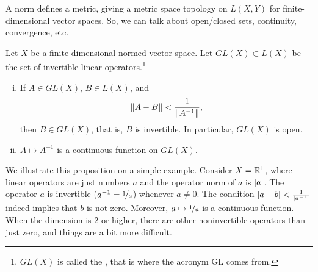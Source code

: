 A norm defines a metric,
giving a metric space topology on $L(X,Y)$ for finite-dimensional vector spaces.
So, we can talk
about open/closed sets, continuity, convergence, etc.

\begin{prop} \label{prop:finitedimpropinv}
Let $X$ be a finite-dimensional normed vector space.
Let $GL(X) \subset L(X)$ be the set of invertible linear
operators.\footnote{$GL(X)$ is called the
\emph{}, that is where the acronym GL
comes from.}
\begin{enumerate}[(i)]
\item \label{finitedimpropinv:i}
If $A \in GL(X)$, $B \in L(X)$, and
\begin{equation} \label{eqcontineq}
\lVert {A-B} \rVert <  \frac{1}{\lVert {A^{-1}} \rVert},
\end{equation}
then $B \in GL(X)$, that is, $B$ is invertible.
In particular, $GL(X)$ is open.
\item \label{finitedimpropinv:ii}
$A \mapsto A^{-1}$ is a continuous
function on $GL(X)$.
\end{enumerate}
\end{prop}

We illustrate this proposition on a simple example.
Consider $X={\mathbb{R}}^1$, where linear operators are just
numbers $a$ and the operator norm of $a$ is $\lvert {a} \rvert$.
The operator $a$ is invertible ($a^{-1} = \nicefrac{1}{a}$)
whenever $a \not=0$.  The condition $\lvert {a-b} \rvert < \frac{1}{\lvert {a^{-1}} \rvert}$
indeed implies that $b$ is not zero.  Moreover, $a \mapsto \nicefrac{1}{a}$
is a continuous function.
When the dimension is $2$ or higher,
there are other noninvertible operators than just zero,
and things are a bit more difficult.

